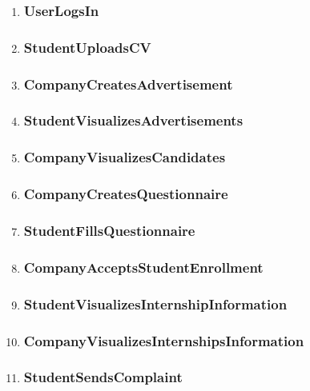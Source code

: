 \begin{enumerate}[label=\textbf{RV\arabic* -}]
\item \subsubsection{UserLogsIn}
\item \subsubsection{StudentUploadsCV}
\item \subsubsection{CompanyCreatesAdvertisement}
\item \subsubsection{StudentVisualizesAdvertisements}
\item \subsubsection{CompanyVisualizesCandidates}
\item \subsubsection{CompanyCreatesQuestionnaire}
\item \subsubsection{StudentFillsQuestionnaire}
\item \subsubsection{CompanyAcceptsStudentEnrollment}
\item \subsubsection{StudentVisualizesInternshipInformation}
\item \subsubsection{CompanyVisualizesInternshipsInformation}
\item \subsubsection{StudentSendsComplaint}

\end{enumerate}
